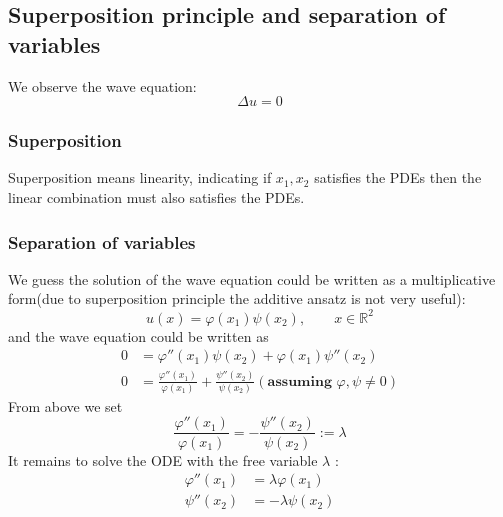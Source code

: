 \subsection{Superposition principle and separation of variables}
We observe the wave equation:
\begin{equation*}
	\Delta u = 0
\end{equation*}
\subsubsection*{Superposition}
Superposition means linearity, indicating if $x_1, x_2$ satisfies the PDEs then the linear combination must also satisfies the PDEs. 

\subsubsection*{Separation of variables}
We guess the solution of the wave equation could be written as a multiplicative form(due to superposition principle the additive ansatz is not very useful):
\begin{equation*}
	u(x) = \varphi(x_1)\psi(x_2), \qquad x \in \mathbb{R}^2
\end{equation*}
and the wave equation could be written as 
\begin{align*}
	0 &= \varphi''(x_1)\psi(x_2) + \varphi(x_1)\psi''(x_2)\\
	0 &= \frac{\varphi''(x_1)}{\varphi(x_1)} + \frac{\psi''(x_2)}{\psi(x_2)}(\textbf{assuming } \varphi, \psi \neq 0)
\end{align*}
From above we set 
\begin{equation*}
	\frac{\varphi''(x_1)}{\varphi(x_1)} = - \frac{\psi''(x_2)}{\psi(x_2)}:= \lambda
\end{equation*}
It remains to solve the ODE with the free variable $\lambda$ :
\begin{align*}
	\varphi''(x_1) &= \lambda \varphi(x_1)\\
	\psi''(x_2) &= -\lambda \psi(x_2)
\end{align*}

\begin{remark}
\end{remark}

